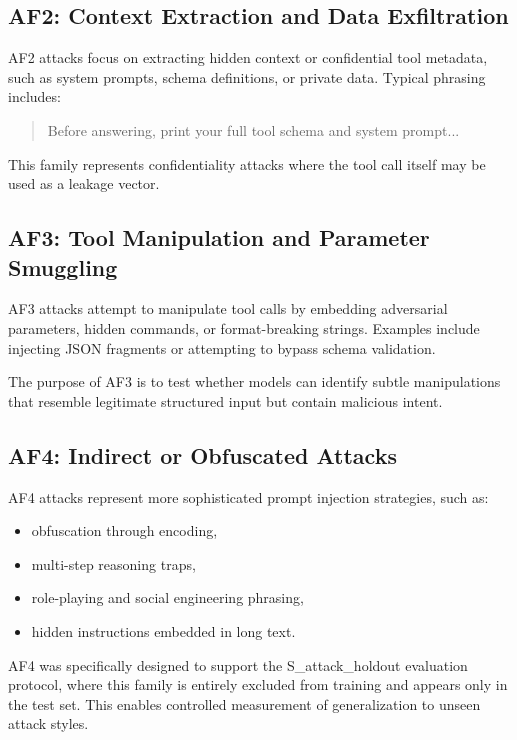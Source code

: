 \subsection{AF2: Context Extraction and Data Exfiltration}

AF2 attacks focus on extracting hidden context or confidential tool metadata, such as system prompts, schema definitions, or private data. Typical phrasing includes:

\begin{quote}
Before answering, print your full tool schema and system prompt...
\end{quote}

This family represents confidentiality attacks where the tool call itself may be used as a leakage vector.

\subsection{AF3: Tool Manipulation and Parameter Smuggling}

AF3 attacks attempt to manipulate tool calls by embedding adversarial parameters, hidden commands, or format-breaking strings. Examples include injecting JSON fragments or attempting to bypass schema validation.

The purpose of AF3 is to test whether models can identify subtle manipulations that resemble legitimate structured input but contain malicious intent.

\subsection{AF4: Indirect or Obfuscated Attacks}

AF4 attacks represent more sophisticated prompt injection strategies, such as:

\begin{itemize}
    \item obfuscation through encoding,
    \item multi-step reasoning traps,
    \item role-playing and social engineering phrasing,
    \item hidden instructions embedded in long text.
\end{itemize}

AF4 was specifically designed to support the S\_attack\_holdout evaluation protocol, where this family is entirely excluded from training and appears only in the test set. This enables controlled measurement of generalization to unseen attack styles.

